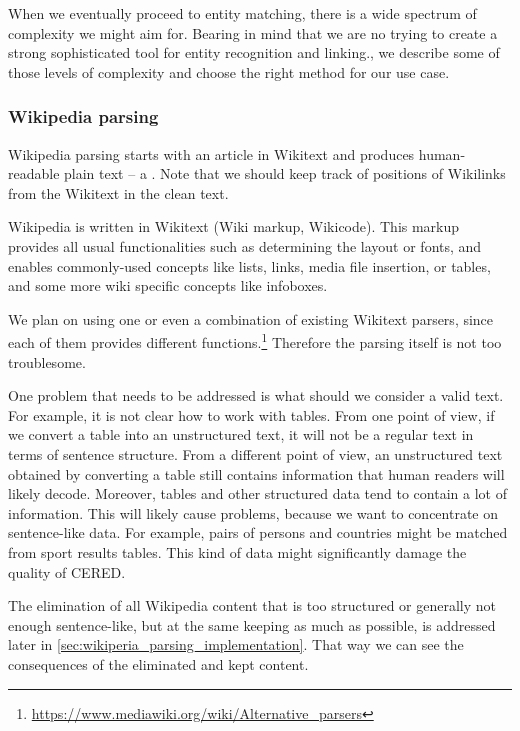 When we eventually proceed to entity matching, there is a wide spectrum of complexity we might aim for. Bearing in mind that we are no trying to create a strong sophisticated tool for entity recognition and linking., we describe some of those levels of complexity and choose the right method for our use case.



 

\subsubsection{Wikipedia parsing}
\label{sec:wikipedia_parsing_analysis}
Wikipedia parsing starts with an article in Wikitext and produces human-readable plain text -- a . Note that we should keep track of positions of Wikilinks from the Wikitext in the clean text.

Wikipedia is written in Wikitext (Wiki markup, Wikicode). This markup provides all usual functionalities such as determining the layout or fonts, and enables commonly-used concepts like lists, links, media file insertion, or tables, and some more wiki specific concepts like infoboxes.

We plan on using one or even a combination of existing Wikitext parsers, since each of them provides different functions.\footnote{\url{https://www.mediawiki.org/wiki/Alternative\_parsers}} Therefore the parsing itself is not too troublesome. 

One problem that needs to be addressed is what should we consider a valid text. For example, it is not clear how to work with tables. From one point of view, if we convert a table into an unstructured text, it will not be a regular text in terms of sentence structure. From a different point of view, an unstructured text obtained by converting a table still contains information that human readers will likely decode. Moreover, tables and other structured data tend to contain a lot of information. This will likely cause problems, because we want to concentrate on sentence-like data. For example, pairs of persons and countries might be matched from sport results tables. This kind of data might significantly damage the quality of CERED.

The elimination of all Wikipedia content that is too structured or generally not enough sentence-like, but at the same keeping as much as possible, is addressed later in \autoref{sec:wikiperia_parsing_implementation}. That way we can see the consequences of the eliminated and kept content.


